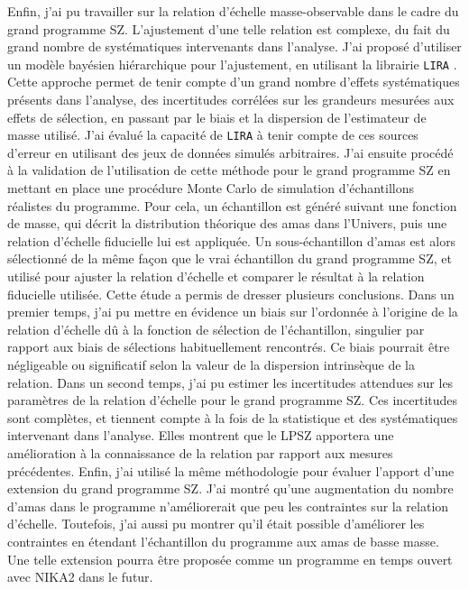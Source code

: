 Enfin, j'ai pu travailler sur la relation d'échelle masse-observable dans le cadre du grand programme SZ.
L'ajustement d'une telle relation est complexe, du fait du grand nombre de systématiques intervenants dans l'analyse.
J'ai proposé d'utiliser un modèle bayésien hiérarchique pour l'ajustement, en utilisant la librairie \texttt{LIRA} \cite{sereno_bayesian_2016}.
Cette approche permet de tenir compte d'un grand nombre d'effets systématiques présents dans l'analyse, des incertitudes corrélées sur les grandeurs mesurées aux effets de sélection, en passant par le biais et la dispersion de l'estimateur de masse utilisé.
J'ai évalué la capacité de \texttt{LIRA} à tenir compte de ces sources d'erreur en utilisant des jeux de données simulés arbitraires.
J'ai ensuite procédé à la validation de l'utilisation de cette méthode pour le grand programme SZ en mettant en place une procédure Monte Carlo de simulation d'échantillons réalistes du programme.
Pour cela, un échantillon est généré suivant une fonction de masse, qui décrit la distribution théorique des amas dans l'Univers, puis une relation d'échelle fiducielle lui est appliquée.
Un sous-échantillon d'amas est alors sélectionné de la même façon que le vrai échantillon du grand programme SZ, et utilisé pour ajuster la relation d'échelle et comparer le résultat à la relation fiducielle utilisée.
Cette étude a permis de dresser plusieurs conclusions.
Dans un premier temps, j'ai pu mettre en évidence un biais sur l'ordonnée à l'origine de la relation d'échelle dû à la fonction de sélection de l'échantillon, singulier par rapport aux biais de sélections habituellement rencontrés.
Ce biais pourrait être négligeable ou significatif selon la valeur de la dispersion intrinsèque de la relation.
Dans un second temps, j'ai pu estimer les incertitudes attendues sur les paramètres de la relation d'échelle pour le grand programme SZ.
Ces incertitudes sont complètes, et tiennent compte à la fois de la statistique et des systématiques intervenant dans l'analyse.
Elles montrent que le LPSZ apportera une amélioration à la connaissance de la relation par rapport aux mesures précédentes.
Enfin, j'ai utilisé la même méthodologie pour évaluer l'apport d'une extension du grand programme SZ.
J'ai montré qu'une augmentation du nombre d'amas dans le programme n'améliorerait que peu les contraintes sur la relation d'échelle.
Toutefois, j'ai aussi pu montrer qu'il était possible d'améliorer les contraintes en étendant l'échantillon du programme aux amas de basse masse.
Une telle extension pourra être proposée comme un programme en temps ouvert avec NIKA2 dans le futur.
